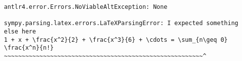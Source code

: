 \begin{verbatim}
antlr4.error.Errors.NoViableAltException: None

sympy.parsing.latex.errors.LaTeXParsingError: I expected something else here
1 + x + \frac{x^2}{2} + \frac{x^3}{6} + \cdots = \sum_{n\geq 0} \frac{x^n}{n!}
~~~~~~~~~~~~~~~~~~~~~~~~~~~~~~~~~~~~~~~~~~~~~~~~~~~~~~~~^
\end{verbatim}